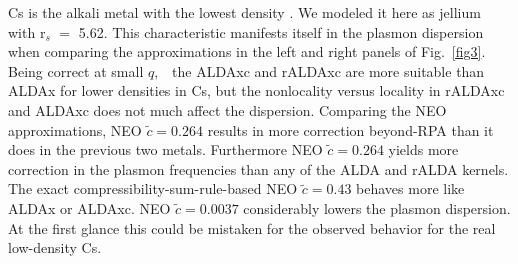 \documentclass[aps,amsmath,amssymb, preprint, 12pt]{revtex4-1}
\begin{document}


Cs is the alkali metal with the lowest density \cite{FSE97}. We modeled it here as jellium with r$_s$ $=$ 5.62. This characteristic manifests itself in the plasmon dispersion when comparing the approximations in the left and right panels of Fig.~\ref{fig3}. Being correct at small  \( q, \) \ the ALDAxc and rALDAxc  are more suitable than ALDAx for lower densities in Cs, but the nonlocality versus locality in rALDAxc and ALDAxc does not much affect the dispersion. Comparing the NEO approximations, NEO  \( \widetilde{c}=0.264 \)  results in more correction beyond-RPA than it does in the previous two metals. Furthermore NEO  \( \widetilde{c}=0.264 \)  yields more correction in the plasmon frequencies than any of the ALDA and rALDA kernels. The exact compressibility-sum-rule-based NEO  \( \widetilde{c}=0.43 \)  behaves more like ALDAx or ALDAxc. NEO  \( \widetilde{c}=0.0037 \)  considerably lowers the plasmon dispersion. At the first glance this could be mistaken for the observed behavior for the real low-density Cs.





\end{document}
